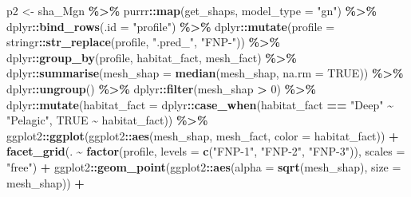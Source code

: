 \documentclass[
]{book}
\newenvironment{Shaded}{\begin{snugshade}}{\end{snugshade}}
\newcommand{\AttributeTok}[1]{\textcolor[rgb]{0.13,0.29,0.53}{#1}}
\newcommand{\ConstantTok}[1]{\textcolor[rgb]{0.56,0.35,0.01}{#1}}
\newcommand{\DecValTok}[1]{\textcolor[rgb]{0.00,0.00,0.81}{#1}}
\newcommand{\FunctionTok}[1]{\textcolor[rgb]{0.13,0.29,0.53}{\textbf{#1}}}
\newcommand{\NormalTok}[1]{#1}
\newcommand{\OtherTok}[1]{\textcolor[rgb]{0.56,0.35,0.01}{#1}}
\newcommand{\SpecialCharTok}[1]{\textcolor[rgb]{0.81,0.36,0.00}{\textbf{#1}}}
\newcommand{\StringTok}[1]{\textcolor[rgb]{0.31,0.60,0.02}{#1}}
\begin{document}
\begin{Shaded}
\begin{Highlighting}[]
\NormalTok{p2 }\OtherTok{\textless{}{-}} 
\NormalTok{  sha\_Mgn }\SpecialCharTok{\%\textgreater{}\%}
\NormalTok{  purrr}\SpecialCharTok{::}\FunctionTok{map}\NormalTok{(get\_shaps, }\AttributeTok{model\_type =} \StringTok{"gn"}\NormalTok{) }\SpecialCharTok{\%\textgreater{}\%}
\NormalTok{  dplyr}\SpecialCharTok{::}\FunctionTok{bind\_rows}\NormalTok{(}\AttributeTok{.id =} \StringTok{"profile"}\NormalTok{) }\SpecialCharTok{\%\textgreater{}\%}
\NormalTok{  dplyr}\SpecialCharTok{::}\FunctionTok{mutate}\NormalTok{(}\AttributeTok{profile =}\NormalTok{ stringr}\SpecialCharTok{::}\FunctionTok{str\_replace}\NormalTok{(profile, }\StringTok{".pred\_"}\NormalTok{, }\StringTok{"FNP{-}"}\NormalTok{)) }\SpecialCharTok{\%\textgreater{}\%}
\NormalTok{  dplyr}\SpecialCharTok{::}\FunctionTok{group\_by}\NormalTok{(profile, habitat\_fact, mesh\_fact) }\SpecialCharTok{\%\textgreater{}\%}
\NormalTok{  dplyr}\SpecialCharTok{::}\FunctionTok{summarise}\NormalTok{(}\AttributeTok{mesh\_shap =} \FunctionTok{median}\NormalTok{(mesh\_shap, }\AttributeTok{na.rm =} \ConstantTok{TRUE}\NormalTok{)) }\SpecialCharTok{\%\textgreater{}\%}
\NormalTok{  dplyr}\SpecialCharTok{::}\FunctionTok{ungroup}\NormalTok{() }\SpecialCharTok{\%\textgreater{}\%}
\NormalTok{  dplyr}\SpecialCharTok{::}\FunctionTok{filter}\NormalTok{(mesh\_shap }\SpecialCharTok{\textgreater{}} \DecValTok{0}\NormalTok{) }\SpecialCharTok{\%\textgreater{}\%}
\NormalTok{  dplyr}\SpecialCharTok{::}\FunctionTok{mutate}\NormalTok{(}\AttributeTok{habitat\_fact =}\NormalTok{ dplyr}\SpecialCharTok{::}\FunctionTok{case\_when}\NormalTok{(habitat\_fact }\SpecialCharTok{==} \StringTok{"Deep"} \SpecialCharTok{\textasciitilde{}} \StringTok{"Pelagic"}\NormalTok{, }\ConstantTok{TRUE} \SpecialCharTok{\textasciitilde{}}\NormalTok{ habitat\_fact)) }\SpecialCharTok{\%\textgreater{}\%}
\NormalTok{  ggplot2}\SpecialCharTok{::}\FunctionTok{ggplot}\NormalTok{(ggplot2}\SpecialCharTok{::}\FunctionTok{aes}\NormalTok{(mesh\_shap, mesh\_fact, }\AttributeTok{color =}\NormalTok{ habitat\_fact)) }\SpecialCharTok{+}
  \FunctionTok{facet\_grid}\NormalTok{(. }\SpecialCharTok{\textasciitilde{}} \FunctionTok{factor}\NormalTok{(profile, }\AttributeTok{levels =} \FunctionTok{c}\NormalTok{(}\StringTok{"FNP{-}1"}\NormalTok{, }\StringTok{"FNP{-}2"}\NormalTok{, }\StringTok{"FNP{-}3"}\NormalTok{)), }\AttributeTok{scales =} \StringTok{"free"}\NormalTok{) }\SpecialCharTok{+}
\NormalTok{  ggplot2}\SpecialCharTok{::}\FunctionTok{geom\_point}\NormalTok{(ggplot2}\SpecialCharTok{::}\FunctionTok{aes}\NormalTok{(}\AttributeTok{alpha =} \FunctionTok{sqrt}\NormalTok{(mesh\_shap), }\AttributeTok{size =}\NormalTok{ mesh\_shap)) }\SpecialCharTok{+}

\end{Highlighting}
\end{Shaded}
\end{document}
